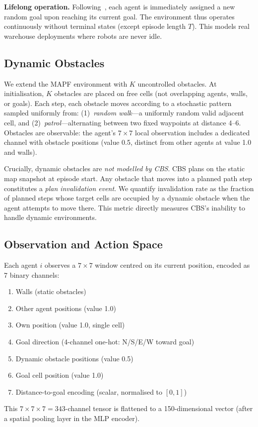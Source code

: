 \documentclass[letterpaper,twocolumn,10pt]{article}
\begin{document}
\textbf{Lifelong operation.} Following~\cite{ma2017lifelong}, each agent is
immediately assigned a new random goal upon reaching its current goal. The environment
thus operates continuously without terminal states (except episode length $T$).
This models real warehouse deployments where robots are never idle.

\subsection{Dynamic Obstacles}

We extend the MAPF environment with $K$ uncontrolled obstacles. At initialisation,
$K$ obstacles are placed on free cells (not overlapping agents, walls, or goals).
Each step, each obstacle moves according to a stochastic pattern sampled uniformly
from: (1)~\emph{random walk}---a uniformly random valid adjacent cell, and
(2)~\emph{patrol}---alternating between two fixed waypoints at distance 4--6.
Obstacles are observable: the agent's $7\times 7$ local observation includes a
dedicated channel with obstacle positions (value 0.5, distinct from other agents
at value 1.0 and walls).

Crucially, dynamic obstacles are \emph{not modelled by CBS}. CBS plans on the static
map snapshot at episode start. Any obstacle that moves into a planned path step
constitutes a \emph{plan invalidation event}. We quantify invalidation rate as the
fraction of planned steps whose target cells are occupied by a dynamic obstacle when
the agent attempts to move there. This metric directly measures CBS's inability to
handle dynamic environments.

\subsection{Observation and Action Space}

Each agent $i$ observes a $7\times 7$ window centred on its current position,
encoded as 7 binary channels:
\begin{enumerate}[leftmargin=*,itemsep=1pt,topsep=1pt]
  \item Walls (static obstacles)
  \item Other agent positions (value 1.0)
  \item Own position (value 1.0, single cell)
  \item Goal direction (4-channel one-hot: N/S/E/W toward goal)
  \item Dynamic obstacle positions (value 0.5)
  \item Goal cell position (value 1.0)
  \item Distance-to-goal encoding (scalar, normalised to $[0,1]$)
\end{enumerate}
This $7\times 7 \times 7 = 343$-channel tensor is flattened to a 150-dimensional
vector (after a spatial pooling layer in the MLP encoder).
\end{document}
